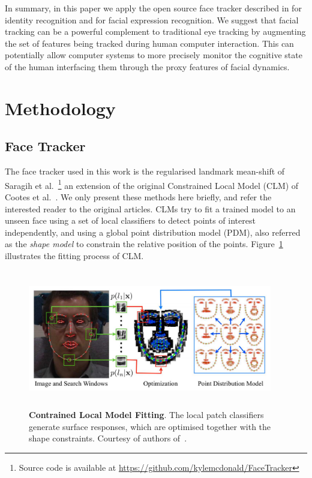 \documentclass[]{article}
\begin{document}
In summary, in this paper we apply the open source face tracker described in \cite{saragih2011deformable} for identity
recognition and for facial expression recognition. We suggest that facial tracking can be a powerful complement to
traditional eye tracking  by augmenting the set of features being tracked during human computer interaction. This  can
potentially allow computer systems to more precisely monitor the cognitive state of the human interfacing them through
the proxy features of facial dynamics.


\section{Methodology}


\subsection{Face Tracker}
The face tracker used in this work is the regularised landmark mean-shift of Saragih et
al.~\cite{saragih2011deformable}\footnote{Source code is available at
  \url{https://github.com/kylemcdonald/FaceTracker}} an extension of
the original Constrained Local Model (CLM) of Cootes et al.~\cite{cristinacce2006feature}. We only present these methods
here briefly, and refer the interested reader to the original articles. CLMs try to fit a trained model to an unseen
face using a set of local classifiers to detect points of interest independently, and using a global point distribution model (PDM),
also referred as the \textit{shape model} to constrain the relative position of the points. Figure~\ref{fig:CLM}
illustrates the fitting process of CLM.

\begin{figure}[htbp]
  \centering
  \includegraphics[width=0.95\textwidth,height=60mm]{figures/CLM.png}
  \caption{\textbf{Contrained Local Model Fitting}. The local patch classifiers generate surface responses, which are
  optimised together with the shape constraints. Courtesy of authors of~\cite{saragih2011deformable}.}
  \label{fig:CLM}
\end{figure}
\end{document}
